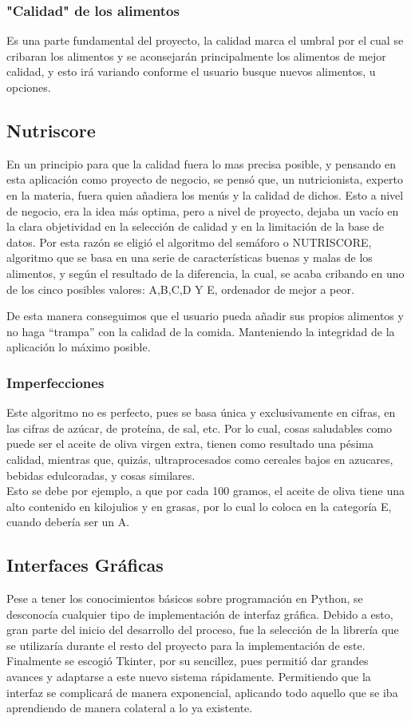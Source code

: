\subsubsection{"Calidad" de los alimentos}
Es una parte fundamental del proyecto, la calidad marca el umbral por el cual se cribaran los alimentos y se aconsejarán principalmente los alimentos de mejor calidad, y esto irá variando conforme el usuario busque nuevos alimentos, u opciones.
\subsection{Nutriscore}
En un principio para que la calidad fuera lo mas precisa posible, y pensando en esta aplicación como proyecto de negocio, se pensó que, un nutricionista, experto en la materia, fuera quien añadiera los menús y la calidad de dichos. Esto a nivel de negocio, era la idea más optima, pero a nivel de proyecto, dejaba un vacío en la clara objetividad en la selección de calidad y en la limitación de la base de datos. Por esta razón se eligió el algoritmo del semáforo o NUTRISCORE, algoritmo que se basa en una serie de características buenas y malas de los alimentos, y según el resultado de la diferencia, la cual, se acaba cribando en uno de los cinco posibles valores: A,B,C,D Y E, ordenador de mejor a peor.\\


De esta manera conseguimos que el usuario pueda añadir sus propios alimentos y no haga “trampa” con la calidad de la comida. Manteniendo la integridad de la aplicación lo máximo posible.
\subsubsection{Imperfecciones}
Este algoritmo no es perfecto, pues se basa única y exclusivamente en cifras, en las cifras de azúcar, de proteína, de sal, etc. Por lo cual, cosas saludables como puede ser el aceite de oliva virgen extra, tienen como resultado una pésima calidad, mientras que, quizás, ultraprocesados como cereales bajos en azucares, bebidas edulcoradas, y cosas similares. \\
Esto se debe por ejemplo, a que por cada 100 gramos, el aceite de oliva tiene una alto contenido en kilojulios y en grasas, por lo cual lo coloca en la categoría E, cuando debería ser un A.
\subsection{Interfaces Gráficas}
Pese a tener los conocimientos básicos sobre programación en Python, se desconocía cualquier tipo de implementación de interfaz gráfica. Debido a esto, gran parte del inicio del desarrollo del proceso, fue la selección de la librería que se utilizaría durante el resto del proyecto para la implementación de este.\\
Finalmente se escogió Tkinter, por su sencillez, pues permitió dar grandes avances y adaptarse a este nuevo sistema rápidamente. Permitiendo que la interfaz se complicará de manera exponencial, aplicando todo aquello que se iba aprendiendo de manera colateral a lo ya existente.
